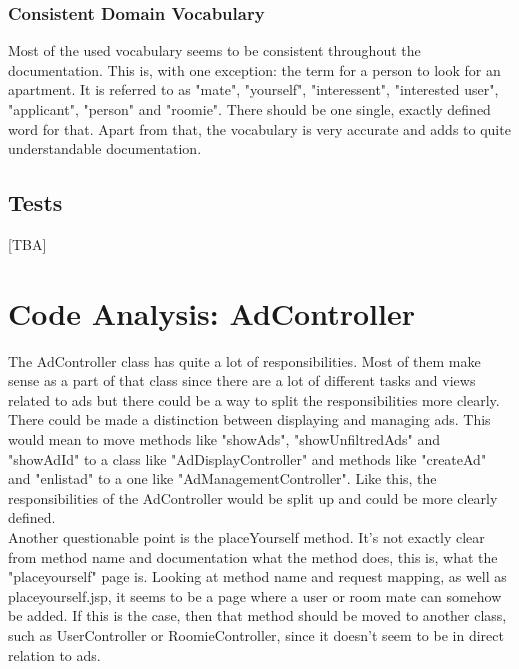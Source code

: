 \documentclass{scrreprt}
\begin{document}
\subsection{Consistent Domain Vocabulary}
Most of the used vocabulary seems to be consistent throughout the documentation. This is, with one exception: the term for a person to look for an apartment. It is referred to as "mate", "yourself", "interessent", "interested user", "applicant", "person" and "roomie". There should be one single, exactly defined word for that. Apart from that, the vocabulary is very accurate and adds to quite understandable documentation.

\section{Tests}
[TBA]

\chapter{Code Analysis: AdController}
The AdController class has quite a lot of responsibilities. Most of them make sense as a part of that class since there are a lot of different tasks and views related to ads but there could be a way to split the responsibilities more clearly. There could be made a distinction between displaying and managing ads. This would mean to move methods like "showAds", "showUnfiltredAds" and "showAdId" to a class like "AdDisplayController" and methods like "createAd" and "enlistad" to a one like "AdManagementController". Like this, the responsibilities of the AdController would be split up and could be more clearly defined. \\

Another questionable point is the placeYourself method. It's not exactly clear from method name and documentation what the method does, this is, what the "placeyourself" page is. Looking at method name and request mapping, as well as placeyourself.jsp, it seems to be a page where a user or room mate can somehow be added. If this is the case, then that method should be moved to another class, such as UserController or RoomieController, since it doesn't seem to be in direct relation to ads.
\end{document}
